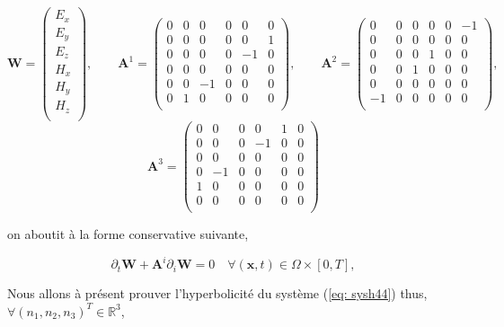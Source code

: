 \documentclass[a4paper,oneside,10pt]{report}
\begin{document}
\begin{equation}
\mathbf{W}=
\begin{pmatrix}
E_x\\
E_y\\
E_z\\
H_x\\
H_y\\
H_z\\
\end{pmatrix},
\qquad
\mathbf{A}^1=
\begin{pmatrix}
0 & 0 & 0 & 0 & 0 & 0\\
0 & 0 & 0 & 0 & 0 & 1\\
0 & 0 & 0 & 0 & -1 & 0\\
0 & 0 & 0 & 0 & 0 & 0\\
0 & 0 & -1 & 0 & 0 & 0\\
0 & 1 & 0 & 0 & 0 & 0\\
\end{pmatrix},
\qquad
\mathbf{A}^2=
\begin{pmatrix}
0 & 0 & 0 & 0 & 0 & -1\\
0 & 0 & 0 & 0 & 0 & 0\\
0 & 0 & 0 & 1 & 0 & 0\\
0 & 0 & 1 & 0 & 0 & 0\\
0 & 0 & 0 & 0 & 0 & 0\\
-1 & 0 & 0 & 0 & 0 & 0\\
\end{pmatrix},
\end{equation}
\begin{equation}
\mathbf{A}^3=
\begin{pmatrix}
0 & 0 & 0 & 0 & 1 & 0\\
0 & 0 & 0 & -1 & 0 & 0\\
0 & 0 & 0 & 0 & 0 & 0\\
0 & -1 & 0 & 0 & 0 & 0\\
1 & 0 & 0 & 0 & 0 & 0\\
0 & 0 & 0 & 0 & 0 & 0\\
\end{pmatrix}
\end{equation}


on aboutit à la forme conservative suivante,

\begin{equation}
\label{eq:sysh44}
\partial_t \mathbf{W} +  \mathbf{A}^i\partial_i \mathbf{W} = 0 \quad \forall (\mathbf{x},t) \in \Omega \times [0,T],
\end{equation}

Nous allons à présent prouver l'hyperbolicité du système (\ref{eq: sysh44}) thus, $\forall (n_1,n_2,n_3)^T \in \mathbb{R}^3$,
\end{document}

